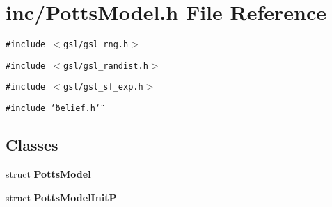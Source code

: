 \section{inc/PottsModel.h File Reference}
\label{PottsModel_8h}
{\tt \#include $<$gsl/gsl\_\-rng.h$>$}\par
{\tt \#include $<$gsl/gsl\_\-randist.h$>$}\par
{\tt \#include $<$gsl/gsl\_\-sf\_\-exp.h$>$}\par
{\tt \#include \char`\"{}belief.h\char`\"{}}\par
\subsection*{Classes}
\begin{CompactItemize}
\item 
struct {\bf PottsModel}
\item 
struct {\bf PottsModelInitP}
\end{CompactItemize}
